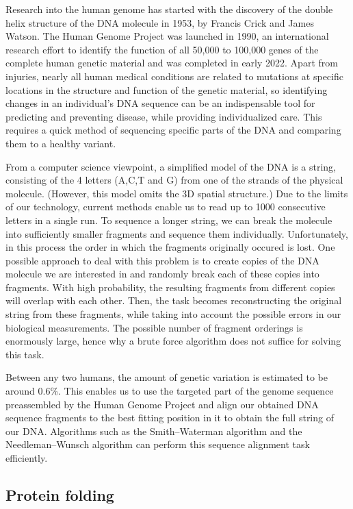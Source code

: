 Research into the human genome has started with the discovery of the double helix structure of the DNA molecule in 1953, by Francis Crick and James Watson. The Human Genome Project\cite{CollinsHumanGenome1995} was launched in 1990, an international research effort to identify the function of all 50,000 to 100,000 genes of the complete human genetic material and was completed in early 2022\cite{zahn_filling_2022}. Apart from injuries, nearly all human medical conditions are related to mutations at specific locations in the structure and function of the genetic material, so identifying changes in an individual's DNA sequence can be an indispensable tool for predicting and preventing disease, while providing individualized care. This requires a quick method of sequencing specific parts of the DNA and comparing them to a healthy variant.

From a computer science viewpoint, a simplified model of the DNA is a string, consisting of the 4 letters (A,C,T and G) from one of the strands of the physical molecule. (However, this model omits the 3D spatial structure.) Due to the limits of our technology, current methods enable us to read up to 1000 consecutive letters in a single run. To sequence a longer string, we can break the molecule into sufficiently smaller fragments and sequence them individually. Unfortunately, in this process the order in which the fragments originally occured is lost. One possible approach to deal with this problem is to create copies of the DNA molecule we are interested in and randomly break each of these copies into fragments. With high probability, the resulting fragments from different copies will overlap with each other. Then, the task becomes reconstructing the original string from these fragments, while taking into account the possible errors in our biological measurements. The possible number of fragment orderings is enormously large, hence why a brute force algorithm does not suffice for solving this task.

Between any two humans, the amount of genetic variation is estimated to be around 0.6\%\cite{the_1000_genomes_project_consortium_global_2015}. This enables us to use the targeted part of the genome sequence preassembled by the Human Genome Project and align our obtained DNA sequence fragments to the best fitting position in it to obtain the full string of our DNA. Algorithms such as the Smith–Waterman algorithm and the Needleman–Wunsch algorithm can perform this sequence alignment task efficiently.

\subsection{Protein folding}

